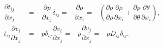 \documentclass[a4paper,fleqn]{cas-sc}
\theoremstyle{definition}
\begin{document}
\begin{align} \label{App:tenzor napona Ojler}
	\dfrac{\partial t_{ij}}{\partial x_j} & = 
	- \dfrac{\partial p}{\partial x_j}\delta_{ij} 
	= - \dfrac{\partial p}{\partial x_i} 
	= - \left(\dfrac{\partial p}{\partial\rho}\dfrac{\partial\rho}{\partial x_i} 
	+ \dfrac{\partial p}{\partial\theta}\dfrac{\partial\theta}{\partial x_i} \right), 
	\\
	t_{ij}\dfrac{\partial v_i}{\partial x_j} & 
	= - p \delta_{ij} \dfrac{\partial v_i}{\partial x_j} 
	= - p \dfrac{\partial v_j}{\partial x_j} 
	= - p D_{ij} \delta_{ij}. 
	\nonumber 
\end{align} 

\end{document}
